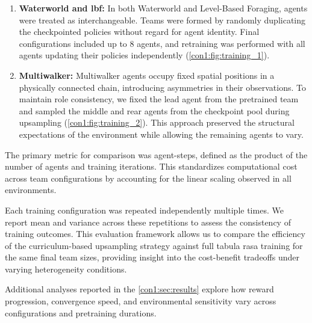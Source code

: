 \documentclass{article}
\begin{document}
\begin{enumerate}
    \item \textbf{Waterworld and \gls{lbf}:}
    In both Waterworld and Level-Based Foraging, agents were treated as interchangeable. 
    Teams were formed by randomly duplicating the checkpointed policies without regard 
    for agent identity. Final configurations included up to 8 agents, and retraining was 
    performed with all agents updating their policies independently (\cref{con1:fig:training_1}).
    \item \textbf{Multiwalker:}
    Multiwalker agents occupy fixed spatial positions in a physically connected chain, 
    introducing asymmetries in their observations. To maintain role consistency, 
    we fixed the lead agent from the pretrained team and sampled the middle and rear 
    agents from the checkpoint pool during upsampling (\cref{con1:fig:training_2}). 
    This approach preserved the 
    structural expectations of the environment while allowing the remaining agents to vary. 
\end{enumerate}

The primary metric for comparison was agent-steps, defined as the product of the number of 
agents and training iterations. This standardizes computational cost across team configurations 
by accounting for the linear scaling observed in all environments.

Each training configuration was repeated independently multiple times. We report mean and 
variance across these repetitions to assess the consistency of training outcomes. 
This evaluation framework allows us to compare the efficiency of the curriculum-based 
upsampling strategy against full tabula rasa training for the same final team sizes, 
providing insight into the cost-benefit tradeoffs under varying heterogeneity conditions.

Additional analyses reported in the \cref{con1:sec:results} explore how reward progression, 
convergence speed, and environmental sensitivity vary across configurations and 
pretraining durations.
\end{document}
